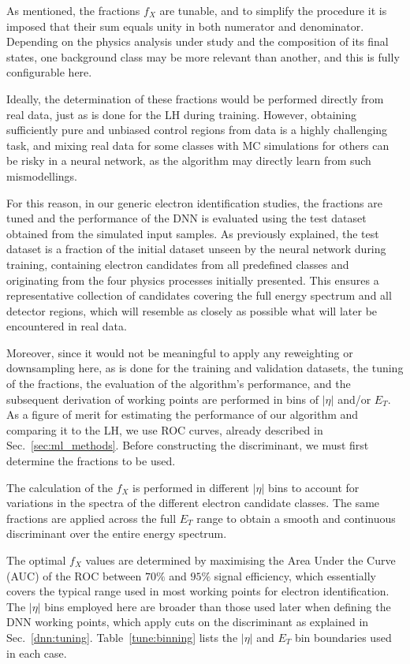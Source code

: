 As mentioned, the fractions $f_{X}$ are tunable, and to simplify the procedure it is imposed that their sum equals unity in both numerator and denominator. Depending on the physics analysis under study and the composition of its final states, one background class may be more relevant than another, and this is fully configurable here.

Ideally, the determination of these fractions would be performed directly from real data, just as is done for the LH during training. However, obtaining sufficiently pure and unbiased control regions from data is a highly challenging task, and mixing real data for some classes with MC simulations for others can be risky in a neural network, as the algorithm may directly learn from such mismodellings.

For this reason, in our generic electron identification studies, the fractions are tuned and the performance of the DNN is evaluated using the test dataset obtained from the simulated input samples. As previously explained, the test dataset is a fraction of the initial dataset unseen by the neural network during training, containing electron candidates from all predefined classes and originating from the four physics processes initially presented. This ensures a representative collection of candidates covering the full energy spectrum and all detector regions, which will resemble as closely as possible what will later be encountered in real data.

Moreover, since it would not be meaningful to apply any reweighting or downsampling here, as is done for the training and validation datasets, the tuning of the fractions, the evaluation of the algorithm’s performance, and the subsequent derivation of working points are performed in bins of $|\eta|$ and/or $E_{T}$.  
As a figure of merit for estimating the performance of our algorithm and comparing it to the LH, we use ROC curves, already described in Sec.~\ref{sec:ml_methods}. Before constructing the discriminant, we must first determine the fractions to be used.

The calculation of the $f_{X}$ is performed in different $|\eta|$ bins to account for variations in the spectra of the different electron candidate classes. The same fractions are applied across the full $E_{T}$ range to obtain a smooth and continuous discriminant over the entire energy spectrum.

The optimal $f_{X}$ values are determined by maximising the Area Under the Curve (AUC) of the ROC between $70\%$ and $95\%$ signal efficiency, which essentially covers the typical range used in most working points for electron identification. The $|\eta|$ bins employed here are broader than those used later when defining the DNN working points, which apply cuts on the discriminant as explained in Sec.~\ref{dnn:tuning}.  
Table~\ref{tune:binning} lists the $|\eta|$ and $E_{T}$ bin boundaries used in each case.

